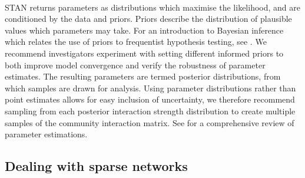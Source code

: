 \documentclass[a4,12pt]{article}
\begin{document}
\begin{refsection}

        \paragraph{}
        STAN returns parameters as distributions which maximise the likelihood, and are conditioned by the data and priors. Priors describe the distribution of plausible values which parameters may take. For an introduction to Bayesian inference which relates the use of priors to frequentist hypothesis testing, see \textcite{Ellison1996}. We recommend investigators experiment with setting different informed priors to both improve model convergence and verify the robustness of parameter estimates. The resulting parameters are termed posterior distributions, from which samples are drawn for analysis. Using parameter distributions rather than point estimates allows for easy inclusion of uncertainty, we therefore recommend sampling from each posterior interaction strength distribution to create multiple samples of the community interaction matrix. See \textcite{Ellison2004} for a comprehensive review of parameter estimations.

    \subsection{Dealing with sparse networks}
    \label{meth:sparse}


\end{refsection}
\end{document}
